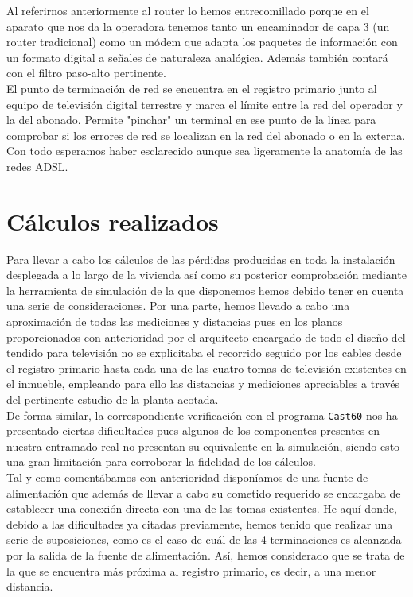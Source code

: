 \documentclass{article}[12 pt]
\begin{document}
			Al referirnos anteriormente al router lo hemos entrecomillado porque en el aparato que nos da la operadora tenemos tanto un encaminador de capa 3 (un router tradicional) como un módem que adapta los paquetes de información con un formato digital a señales de naturaleza analógica. Además también contará con el filtro paso-alto pertinente.\\

			El punto de terminación de red se encuentra en el registro primario junto al equipo de televisión digital terrestre y marca el límite entre la red del operador y la del abonado. Permite "pinchar" un terminal en ese punto de la línea para comprobar si los errores de red se localizan en la red del abonado o en la externa.\\

			Con todo esperamos haber esclarecido aunque sea ligeramente la anatomía de las redes ADSL.

	\section{Cálculos realizados}
		Para llevar a cabo los cálculos de las pérdidas producidas en toda la instalación desplegada a lo largo de la vivienda así como su posterior comprobación mediante la herramienta de simulación de la que disponemos hemos debido tener en cuenta una serie de consideraciones. Por una parte, hemos llevado a cabo una aproximación de todas las mediciones y distancias pues en los planos proporcionados con anterioridad por el arquitecto encargado de todo el diseño del tendido para televisión no se explicitaba el recorrido seguido por los cables desde el registro primario hasta cada una de las cuatro tomas de televisión existentes en el inmueble, empleando para ello las distancias y mediciones apreciables a través del pertinente estudio de la planta acotada.\\

		De forma similar, la correspondiente verificación con el programa \texttt{Cast60} nos ha presentado ciertas dificultades pues algunos de los componentes presentes en nuestra entramado real no presentan su equivalente en la simulación, siendo esto una gran limitación para corroborar la fidelidad de los cálculos.\\

		Tal y como comentábamos con anterioridad disponíamos de una fuente de alimentación que además de llevar a cabo su cometido requerido se encargaba de establecer una conexión directa con una de las tomas existentes. He aquí donde, debido a las dificultades ya citadas previamente, hemos tenido que realizar una serie de suposiciones, como es el caso de cuál de las 4 terminaciones es alcanzada por la salida de la fuente de alimentación. Así, hemos considerado que se trata de la que se encuentra más próxima al registro primario, es decir, a una menor distancia.\\
\end{document}
